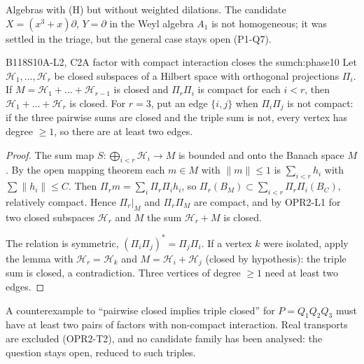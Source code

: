 \begin{caution}[title=What remains open]
Algebras with (H) but without weighted dilations. The candidate $X=(x^3+x)\partial$, $Y=\partial$ in the Weyl algebra $A_1$ is not homogeneous; it was settled in the triage, but the general case stays open (P1-Q7).
\end{caution}

\begin{dimcard}{B118}{S10A-L2, C2}{A factor with compact interaction closes the sum}{\pw}{ch:phase10}
Let $\mathcal H_1,\dots,\mathcal H_r$ be closed subspaces of a Hilbert space with orthogonal projections $\Pi_i$. If $M=\mathcal H_1+\dots+\mathcal H_{r-1}$ is closed and $\Pi_r\Pi_i$ is compact for each $i<r$, then $\mathcal H_1+\dots+\mathcal H_r$ is closed. For $r=3$, put an edge $\{i,j\}$ when $\Pi_i\Pi_j$ is not compact: if the three pairwise sums are closed and the triple sum is not, every vertex has degree $\ge1$, so there are at least two edges.
\end{dimcard}

\begin{proof}
The sum map $S:\bigoplus_{i<r}\mathcal H_i\to M$ is bounded and onto the Banach space $M$. By the open mapping theorem each $m\in M$ with $\|m\|\le1$ is $\sum_{i<r}h_i$ with $\sum\|h_i\|\le C$. Then $\Pi_rm=\sum_i\Pi_r\Pi_ih_i$, so $\Pi_r(B_M)\subset\sum_{i<r}\Pi_r\Pi_i(B_C)$, relatively compact. Hence $\Pi_r|_M$ and $\Pi_r\Pi_M$ are compact, and by OPR2-L1 for two closed subspaces $\mathcal H_r$ and $M$ the sum $\mathcal H_r+M$ is closed.

The relation is symmetric, $(\Pi_i\Pi_j)^*=\Pi_j\Pi_i$. If a vertex $k$ were isolated, apply the lemma with $\mathcal H_r=\mathcal H_k$ and $M=\mathcal H_i+\mathcal H_j$ (closed by hypothesis): the triple sum is closed, a contradiction. Three vertices of degree $\ge1$ need at least two edges.

\end{proof}

\begin{caution}[title=Consequence for C12-Q2]
A counterexample to ``pairwise closed implies triple closed'' for $P=Q_1Q_2Q_3$ must have at least two pairs of factors with non-compact interaction. Real transports are excluded (OPR2-T2), and no candidate family has been analysed: the question stays open, reduced to such triples.
\end{caution}

